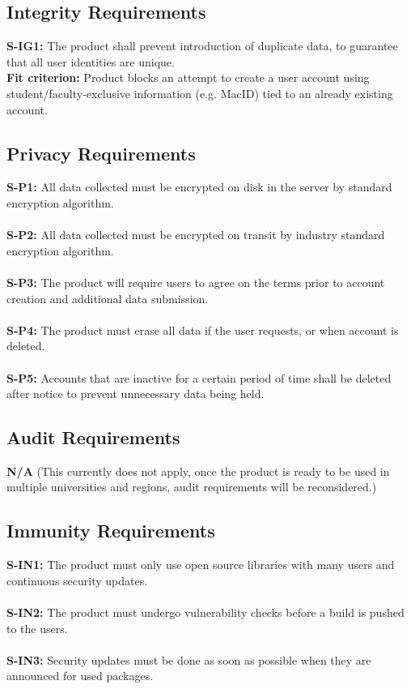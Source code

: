 \documentclass[12pt]{article}
\begin{document}
\subsection{Integrity Requirements}
  \textbf{S-IG1:} The product shall prevent introduction of duplicate data, to guarantee that all user identities are unique.\\
  \textbf{Fit criterion:} Product blocks an attempt to create a user account using student/faculty-exclusive information (e.g. MacID) tied to an already existing account.\\
\subsection{Privacy Requirements}
  \textbf{S-P1:} All data collected must be encrypted on disk in the server by standard encryption algorithm.\\\\
  \textbf{S-P2:} All data collected must be encrypted on transit by industry standard encryption algorithm.\\\\
  \textbf{S-P3:} The product will require users to agree on the terms prior to account creation and additional data submission.\\\\
  \textbf{S-P4:} The product must erase all data if the user requests, or when account is deleted.\\\\
  \textbf{S-P5:} Accounts that are inactive for a certain period of time shall be deleted after notice to prevent unnecessary data being held.\\

\subsection{Audit Requirements}
  \textbf{N/A} (This currently does not apply, once the product is ready to be used in multiple universities and regions, audit requirements will be reconsidered.)\\
\subsection{Immunity Requirements}
  \textbf{S-IN1:} The product must only use open source libraries with many users and continuous security updates.\\\\
  \textbf{S-IN2:} The product must undergo vulnerability checks before a build is pushed to the users.\\\\
  \textbf{S-IN3:} Security updates must be done as soon as possible when they are announced for used packages.\\
\end{document}
